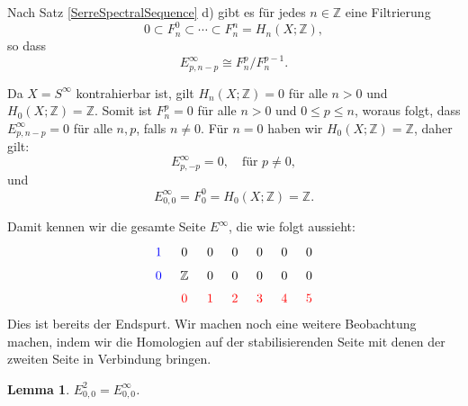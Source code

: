\documentclass[12pt]{article}
\numberwithin{conj}{section}
\newtheorem{lemma}[conj]{Lemma}
\begin{document}
    Nach Satz \ref{SerreSpectralSequence} d) gibt es für jedes
    $n \in \mathbb{Z}$ eine Filtrierung
    \[
        0 \subset F^{0}_{n} \subset \cdots \subset F^{n}_{n} = H_{n}(X;\mathbb{Z}),
    \]
    so dass
    \[
        E^{\infty}_{p,n-p}\cong F_{n}^{p} / F_{n}^{p-1}.
    \]

    Da $X = S^{\infty}$ kontrahierbar ist, gilt $H_{n}(X;\mathbb{Z}) = 0$ für alle
    $n > 0$ und $H_{0}(X;\mathbb{Z}) = \mathbb{Z}$. Somit ist $F_{n}^{p} = 0$ für alle
    $n > 0$ und $0 \leq p \leq n$, woraus folgt, dass $E^{\infty}_{p,n-p}= 0$ für alle
    $n,p$, falls $n \neq 0$. Für $n = 0$ haben wir $H_{0}(X;\mathbb{Z}) = \mathbb{Z}$, daher gilt:
    \[
        E^{\infty}_{p,-p}= 0, \quad \text{für }p \neq 0,
    \]
    und
    \[
        E^{\infty}_{0,0}= F_{0}^{0} = H_{0}(X;\mathbb{Z}) = \mathbb{Z}.
    \]

    Damit kennen wir die gesamte Seite $E^{\infty}$, die wie folgt aussieht:
    \[
        \begin{tikzcd}
            [sep=tiny] {\color{blue}1} & 0 & 0 & 0 & 0 & 0 & 0 \\ {\color{blue}0} & {\mathbb{Z}}
            & 0 & 0 & 0 & 0 & 0 \\ & {\color{red}0} & {\color{red}1} & {\color{red}2} &
            {\color{red}3} & {\color{red}4} & {\color{red}5}
        \end{tikzcd}
    \]
    Dies ist bereits der Endspurt. Wir machen noch eine weitere Beobachtung machen, indem
    wir die Homologien auf der stabilisierenden Seite mit denen der zweiten Seite in
    Verbindung bringen.
    \begin{lemma}
        \label{E2}
        $E^{2}_{0,0}= E^{\infty}_{0,0}$.
    \end{lemma}
\end{document}
